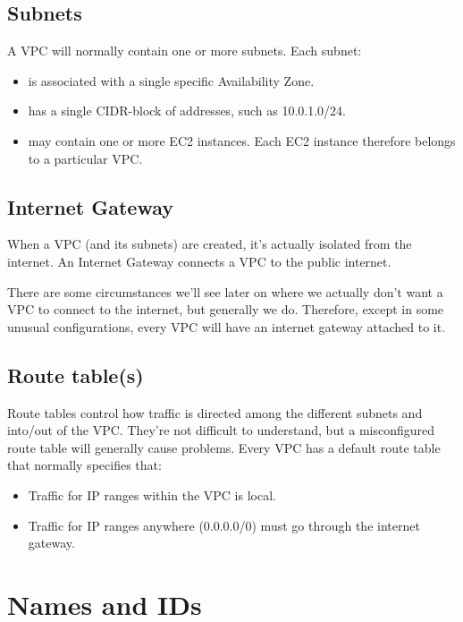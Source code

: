 \subsection{Subnets}

A VPC will normally contain one or more subnets. 
Each subnet:

\begin{itemize}
\item
  is associated with a single specific Availability Zone.
\item
  has a single CIDR-block of addresses, such as 10.0.1.0/24.
\item
  may contain one or more EC2 instances.
  Each EC2 instance therefore belongs to a particular VPC.
\end{itemize}

\subsection{Internet Gateway}

When a VPC (and its subnets) are created, it's actually isolated from the internet.
An Internet Gateway connects a VPC to the public internet.

There are some circumstances we'll see later on where we actually don't want a VPC to connect to the internet, but generally we do.
Therefore, except in some unusual configurations, every VPC will have an internet gateway attached to it.

\subsection{Route table(s)}

Route tables control how traffic is directed among the different subnets and into/out of the VPC.
They're not difficult to understand, but a misconfigured route table will generally cause problems.
Every VPC has a default route table that normally specifies that:
\begin{itemize}
\item Traffic for IP ranges within the VPC is local.
\item Traffic for IP ranges anywhere (0.0.0.0/0) must go through the internet gateway.
\end{itemize}


\section{Names and IDs}\label{names-and-ids}

